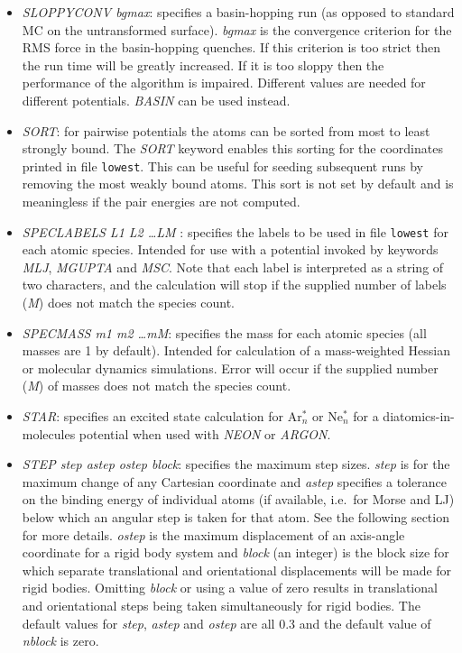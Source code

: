 \documentclass[12pt,a4paper,dvips]{article}
\begin{document}
\begin{itemize}
\item {\it SLOPPYCONV bgmax\/}: specifies a basin-hopping run (as opposed to standard MC
on the untransformed surface). {\it bgmax\/} is the convergence criterion
for the RMS force in the basin-hopping
quenches. If this criterion is too strict then the run time will be greatly increased.
If it is too sloppy then the performance of the algorithm is impaired. Different values
are needed for different potentials. {\it BASIN} can be used instead.

\item {\it SORT}: for pairwise potentials the atoms can be sorted from most to least
strongly bound. The {\it SORT} keyword enables this sorting for the coordinates printed
in file {\tt lowest}. This can be useful for seeding subsequent runs by removing the
most weakly bound atoms. This sort is not set by default and is meaningless if the
pair energies are not computed.

\item {\it SPECLABELS L1 L2 \dots LM \/}: specifies the labels to be used in file {\tt lowest} for each atomic species. Intended for use with a potential invoked by keywords {\it MLJ\/}, {\it MGUPTA\/} and {\it MSC\/}. Note that each label is interpreted as a string of two characters, and the calculation will stop if the supplied number of labels ({\it M}) does not match the species count.

\item {\it SPECMASS m1 m2 \dots mM\/}: specifies the mass for each atomic species (all masses are 1 by default). Intended for calculation of a mass-weighted Hessian or molecular dynamics simulations. Error will occur if the supplied number ({\it M}) of masses does not match the species count.

\item {\it STAR}: specifies an excited state calculation for Ar$^*_n$ or Ne$^*_n$ for
a diatomics-in-molecules potential when used with {\it NEON\/} or {\it ARGON\/}.

\item {\it STEP step astep ostep block\/}: specifies the maximum step sizes. {\it step\/} is
for the maximum change of any Cartesian coordinate and {\it astep\/} specifies a tolerance
on the binding energy of individual atoms (if available, i.e.~for Morse and LJ) below
which an angular step is taken for that atom. See the following section for more details.
{\it ostep\/} is the maximum displacement of an axis-angle coordinate for a rigid body system
and {\it block\/} (an integer) is the block size for which separate translational and orientational
displacements will be made for rigid bodies. Omitting {\it block\/} or using a value of zero results in
translational and orientational steps being taken simultaneously
for rigid bodies. The default values for {\it step\/},
{\it astep\/} and {\it ostep\/} are all 0.3 and the default value of {\it nblock\/} is zero.


\end{itemize}
\end{document}
